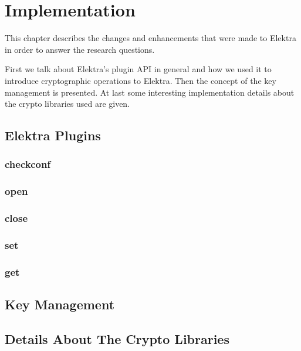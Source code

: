 \chapter{Implementation}

This chapter describes the changes and enhancements that were made to Elektra in order to answer the research questions.

First we talk about Elektra's plugin API in general and how we used it to introduce cryptographic operations to Elektra.
Then the concept of the key management is presented.
At last some interesting implementation details about the crypto libraries used are given.

\section{Elektra Plugins}


    \subsection{checkconf}

    \subsection{open}

    \subsection{close}

    \subsection{set}

    \subsection{get}



\section{Key Management}

\section{Details About The Crypto Libraries}
